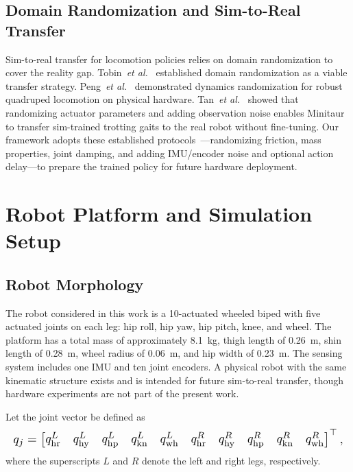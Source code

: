 \documentclass[conference]{IEEEtran}
\begin{document}
\subsection{Domain Randomization and Sim-to-Real Transfer}
Sim-to-real transfer for locomotion policies relies on domain randomization
to cover the reality gap.
Tobin~\emph{et al.}~\cite{tobin2017domain} established domain randomization
as a viable transfer strategy.
Peng~\emph{et al.}~\cite{peng2018simtoreal} demonstrated dynamics
randomization for robust quadruped locomotion on physical hardware.
Tan~\emph{et al.}~\cite{tan2018simtoreal} showed that randomizing actuator
parameters and adding observation noise enables Minitaur to transfer
sim-trained trotting gaits to the real robot without fine-tuning.
Our framework adopts these established protocols~\cite{tobin2017domain,peng2018simtoreal,tan2018simtoreal}---randomizing friction,
mass properties, joint damping, and adding IMU/encoder noise and
optional action delay---to prepare the trained policy for future hardware deployment.

\section{Robot Platform and Simulation Setup}

\subsection{Robot Morphology}
The robot considered in this work is a 10-actuated wheeled biped with five
actuated joints on each leg: hip roll, hip yaw, hip pitch, knee, and wheel.
The platform has a total mass of approximately \SI{8.1}{kg},
thigh length of \SI{0.26}{m},
shin length of \SI{0.28}{m},
wheel radius of \SI{0.06}{m},
and hip width of \SI{0.23}{m}.
The sensing system includes one IMU and ten joint encoders.
A physical robot with the same kinematic structure exists and is intended
for future sim-to-real transfer, though hardware experiments are not part
of the present work.

Let the joint vector be defined as
\begin{equation}
\resizebox{\columnwidth}{!}{$\displaystyle
q_j =
\begin{bmatrix}
q_{\mathrm{hr}}^L &
q_{\mathrm{hy}}^L &
q_{\mathrm{hp}}^L &
q_{\mathrm{kn}}^L &
q_{\mathrm{wh}}^L &
q_{\mathrm{hr}}^R &
q_{\mathrm{hy}}^R &
q_{\mathrm{hp}}^R &
q_{\mathrm{kn}}^R &
q_{\mathrm{wh}}^R
\end{bmatrix}^\top,
$}
\end{equation}
where the superscripts $L$ and $R$ denote the left and right legs, respectively.
\end{document}
